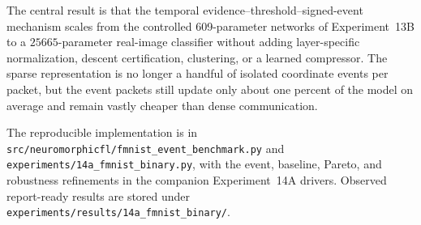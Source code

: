 The central result is that the temporal evidence--threshold--signed-event mechanism scales from the controlled 609-parameter networks of Experiment~13B to a $25665$-parameter real-image classifier without adding layer-specific normalization, descent certification, clustering, or a learned compressor. The sparse representation is no longer a handful of isolated coordinate events per packet, but the event packets still update only about one percent of the model on average and remain vastly cheaper than dense communication.

The reproducible implementation is in \texttt{src/neuromorphicfl/fmnist\_event\_benchmark.py} and \texttt{experiments/14a\_fmnist\_binary.py}, with the event, baseline, Pareto, and robustness refinements in the companion Experiment~14A drivers. Observed report-ready results are stored under \texttt{experiments/results/14a\_fmnist\_binary/}.
